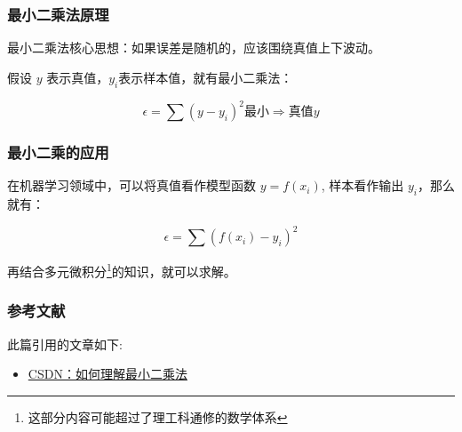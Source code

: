 \subsubsection{最小二乘法原理}

最小二乘法核心思想：如果误差是随机的，应该围绕真值上下波动。

假设 $y$ 表示真值，$y_i$表示样本值，就有最小二乘法：

\begin{equation}
    \epsilon = \sum(y-y_i)^2 \text{最小} \Longrightarrow \text{真值} y
\end{equation}

\subsubsection{最小二乘的应用}

在机器学习领域中，可以将真值看作模型函数 $y=f(x_i)$, 样本看作输出 $y_i$，那么就有：

\begin{equation}
    \epsilon = \sum(f(x_i)-y_i)^2
\end{equation}

再结合多元微积分\footnote{这部分内容可能超过了理工科通修的数学体系}的知识，就可以求解。

\subsubsection{参考文献}
此篇引用的文章如下:
\begin{itemize}
    \item \href{https://blog.csdn.net/ccnt_2012/article/details/81127117}{CSDN：如何理解最小二乘法}
\end{itemize}